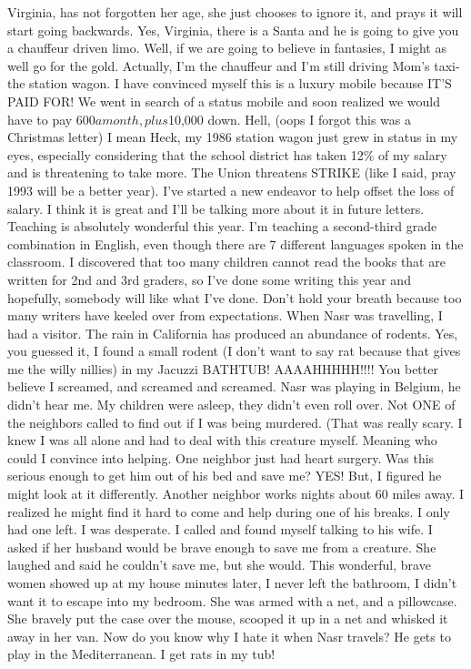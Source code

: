 Virginia, has not forgotten her age, she just chooses to ignore it, and prays it will start going backwards. Yes, Virginia, there is a Santa and
he is going to give you a chauffeur driven limo. Well, if we are going to believe in fantasies, I might as well go for the gold. Actually, I'm
the chauffeur and I'm still driving Mom's taxi-the station wagon. I have convinced myself this is a luxury mobile because IT'S PAID FOR! We went
in search of a status mobile and soon realized we would have to pay $600 a month, plus $10,000 down. Hell, (oops I forgot this was a Christmas
letter) I mean Heck, my 1986 station wagon just grew in status in my eyes, especially considering that the school district has taken 12\% of my
salary and is threatening to take more. The Union threatens STRIKE (like I said, pray 1993 will be a better year). I've started a new endeavor
to help offset the loss of salary. I think it is great and I'll be talking more about it in future letters. Teaching is absolutely wonderful
this year. I'm teaching a second-third grade combination in English, even though there are 7 different languages spoken in the classroom. I
discovered that too many children cannot read the books that are written for 2nd and 3rd graders, so I've done some writing this year and
hopefully, somebody will like what I've done. Don't hold your breath because too many writers have keeled over from expectations. When Nasr was
travelling, I had a visitor. The rain in California has produced an abundance of rodents. Yes, you guessed it, I found a small rodent (I don't
want to say rat because that gives me the willy nillies) in my Jacuzzi BATHTUB! AAAAHHHHH!!!! You better believe I screamed, and screamed and
screamed. Nasr was playing in Belgium, he didn't hear me. My children were asleep, they didn't even roll over. Not ONE of the neighbors called
to find out if I was being murdered. (That was really scary. I knew I was all alone and had to deal with this creature myself. Meaning who could
I convince into helping. One neighbor just had heart surgery. Was this serious enough to get him out of his bed and save me? YES! But, I figured
he might look at it differently. Another neighbor works nights about 60 miles away. I realized he might find it hard to come and help during one
of his breaks. I only had one left. I was desperate. I called and found myself talking to his wife. I asked if her husband would be brave enough
to save me from a creature. She laughed and said he couldn't save me, but she would. This wonderful, brave women showed up at my house minutes
later, I never left the bathroom, I didn't want it to escape into my bedroom. She was armed with a net, and a pillowcase. She bravely put the
case over the mouse, scooped it up in a net and whisked it away in her van. Now do you know why I hate it when Nasr travels? He gets to play in
the Mediterranean. I get rats in my tub!


